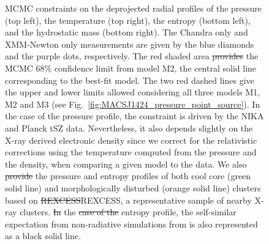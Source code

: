 \documentclass[twocolumn,traditabstract]{aa}
\newcommand{\rexcess}{{\gwpfont REXCESS}} %
\providecommand{\DIFaddtex}[1]{{\protect\color{blue}\uwave{#1}}} %
\providecommand{\DIFdeltex}[1]{{\protect\color{red}\sout{#1}}}                      %
\providecommand{\DIFaddFL}[1]{\DIFadd{#1}} %
\providecommand{\DIFdelFL}[1]{\DIFdel{#1}} %
\providecommand{\DIFaddbeginFL}{} %
\providecommand{\DIFaddendFL}{} %
\providecommand{\DIFdelbeginFL}{} %
\providecommand{\DIFdelendFL}{} %
\providecommand{\DIFadd}[1]{\texorpdfstring{\DIFaddtex{#1}}{#1}} %
\providecommand{\DIFdel}[1]{\texorpdfstring{\DIFdeltex{#1}}{}} %
\begin{document}
\begin{figure}[h]
\caption{\DIFaddbeginFL \footnotesize \DIFaddendFL MCMC constraints on the deprojected radial profiles of the pressure (top left), the temperature (top right), the entropy (bottom left), and the hydrostatic mass (bottom right). The Chandra only and XMM-Newton only measurements are given by the blue diamonds and the purple dots, respectively. The red shaded area \DIFdelbeginFL \DIFdelFL{provides }\DIFdelendFL \DIFaddbeginFL \DIFaddFL{shows }\DIFaddendFL the MCMC 68\% confidence limit from model M2, the central solid line corresponding to the best-fit model. The two red dashed lines give the upper and lower limits allowed considering all three models M1, M2 and M3 (see Fig.~\ref{fig:MACSJ1424_pressure_point_source}). In the case of the pressure profile, the constraint is driven by the NIKA and Planck tSZ data. Nevertheless, it also depends slightly on the X-ray derived electronic density since we correct for the relativistic corrections using the temperature computed from the pressure and the density, when comparing a given model to the data. We also \DIFdelbeginFL \DIFdelFL{provide }\DIFdelendFL \DIFaddbeginFL \DIFaddFL{show }\DIFaddendFL the pressure \citep{arnaud2010} and entropy \citep{pratt2010} profiles of both cool core (green solid line) and morphologically disturbed (orange solid line) clusters based on \DIFdelbeginFL \DIFdelFL{REXCESS}\DIFdelendFL \DIFaddbeginFL \rexcess\DIFaddendFL , a representative sample of nearby X-ray clusters. \DIFdelbeginFL \DIFdelFL{In }\DIFdelendFL \DIFaddbeginFL \DIFaddFL{For }\DIFaddendFL the \DIFdelbeginFL \DIFdelFL{case of the }\DIFdelendFL entropy profile, the self-similar expectation from non-radiative simulations from \cite{voit2005b} is also represented as a black solid line.}
\label{fig:MACSJ1424_MCMC_tk_profile}
\end{figure}
\end{document}
